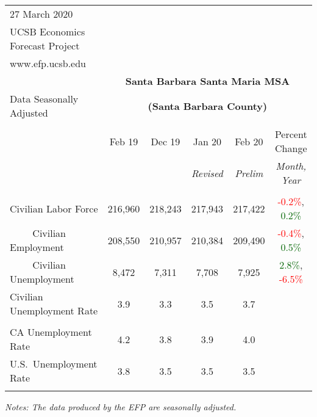 \documentclass[12pt]{article}
\begin{document}
\begin{table}
\begin{tabular}{|l|c|c|c|c|c|}
\multicolumn{1}{l}{\small 27 March 2020} & \multicolumn{5}{c}{} \\
\multicolumn{1}{l}{\small UCSB Economics Forecast Project} & \multicolumn{5}{c}{} \\
\multicolumn{1}{l}{\small www.efp.ucsb.edu} & \multicolumn{5}{c}{} \\
\multicolumn{1}{c}{} & \multicolumn{5}{c}{\large \textbf{Santa Barbara Santa Maria MSA}} \\
\multicolumn{1}{l}{\small Data Seasonally Adjusted} & \multicolumn{5}{c}{\small \textbf{(Santa Barbara County)}} \\ \hline \hline
& & & & & \\
 & Feb 19 & Dec 19 & Jan 20 & Feb 20 & Percent Change \\
 & & & \small \textit{Revised} & \small \textit{Prelim} & \small \textit{Month, Year} \\ \hline
& & & & & \\
Civilian Labor Force & 216,960 & 218,243 & 217,943 & 217,422 & \textcolor{red}{-0.2\%}, \textcolor{darkgreen}{0.2\%} \\
$\qquad$ \small Civilian Employment & 208,550 & 210,957 & 210,384 & 209,490 & \textcolor{red}{-0.4\%}, \textcolor{darkgreen}{0.5\%} \\
$\qquad$ \small Civilian Unemployment & 8,472 & 7,311 & 7,708 & 7,925 & \textcolor{darkgreen}{2.8\%}, \textcolor{red}{-6.5\%} \\
Civilian Unemployment Rate & 3.9 & 3.3 & 3.5 & 3.7 & \\
& & & & & \\
CA Unemployment Rate & 4.2 & 3.8 & 3.9 & 4.0 & \\
U.S.\ Unemployment Rate & 3.8 & 3.5 & 3.5 & 3.5 & \\
& & & & & \\ \hline \hline
\end{tabular}
\par
\vspace{.5em}
\footnotesize
\textit{Notes: The data produced by the EFP are seasonally adjusted.}
\end{table}
\end{document}
